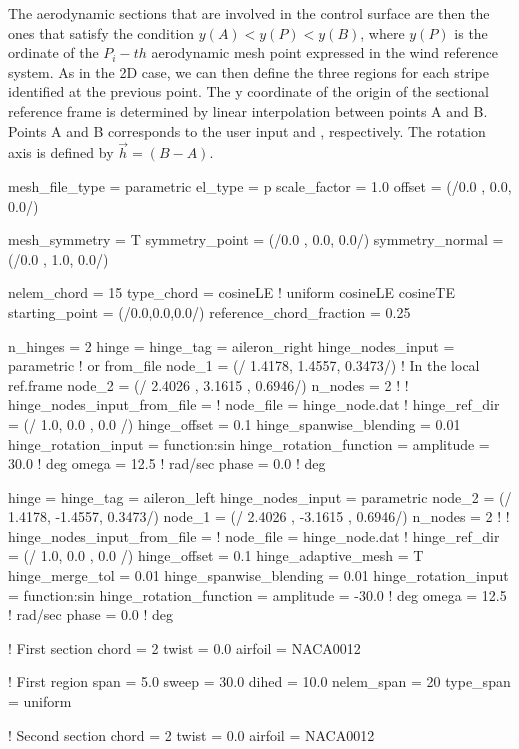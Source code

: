 The aerodynamic sections that are involved in the control surface are then the 
ones that satisfy the condition $y(A) < y(P) < y(B)$, where $y(P)$ is the 
ordinate of the $P_i-th$ aerodynamic mesh point expressed in the wind reference system. 
As in the 2D case, we can then define the three regions for each stripe identified 
at the previous point. The y coordinate of the origin of the sectional reference 
frame is determined by linear interpolation between points A and B. 
Points A and B corresponds to the user input  and , respectively. 
The rotation axis is defined by $\Vec{h} = (B - A)$.

\begin{inputfile}[frame=single, caption={Parametric geometry for flapped wing}, 
  label={file:parametric_example_flapped_wing.in}]
mesh_file_type = parametric
el_type = p
scale_factor = 1.0
offset = (/0.0 , 0.0,  0.0/)

mesh_symmetry = T
symmetry_point   = (/0.0 , 0.0,  0.0/)
symmetry_normal = (/0.0 , 1.0,  0.0/)

nelem_chord = 15
type_chord = cosineLE   ! uniform  cosineLE  cosineTE
starting_point = (/0.0,0.0,0.0/)
reference_chord_fraction = 0.25

n_hinges = 2
hinge = {
  hinge_tag = aileron_right
  hinge_nodes_input = parametric      ! or from_file
  node_1 = (/ 1.4178, 1.4557, 0.3473/)  ! In the local ref.frame
  node_2 = (/ 2.4026  , 3.1615  , 0.6946/)
  n_nodes = 2
  ! }
  ! hinge_nodes_input_from_file = {
  !   node_file = hinge_node.dat
  ! }
  hinge_ref_dir = (/ 1.0, 0.0 , 0.0 /)
  hinge_offset  = 0.1
  hinge_spanwise_blending = 0.01
  hinge_rotation_input = function:sin
  hinge_rotation_function = {
    amplitude = 30.0    ! deg
    omega     =  12.5   ! rad/sec
    phase     =  0.0    ! deg
  }

hinge = {
  hinge_tag = aileron_left
  hinge_nodes_input = parametric      
  node_2 = (/ 1.4178, -1.4557, 0.3473/)  
  node_1 = (/ 2.4026  , -3.1615  , 0.6946/)
  n_nodes = 2
  ! }
  ! hinge_nodes_input_from_file = {
  !   node_file = hinge_node.dat
  ! }
  hinge_ref_dir = (/ 1.0, 0.0 , 0.0 /)
  hinge_offset  = 0.1
  hinge_adaptive_mesh = T
  hinge_merge_tol = 0.01
  hinge_spanwise_blending = 0.01
  hinge_rotation_input = function:sin
  hinge_rotation_function = {
    amplitude = -30.0    ! deg
    omega     =  12.5    ! rad/sec
    phase     =  0.0     ! deg
  }


! First section
chord = 2
twist = 0.0
airfoil = NACA0012

! First region
span = 5.0
sweep = 30.0
dihed = 10.0
nelem_span = 20
type_span = uniform

! Second section
chord = 2
twist = 0.0
airfoil = NACA0012
\end{inputfile}

